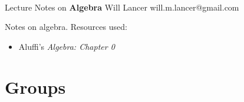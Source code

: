 \documentclass[11pt]{article}
\begin{document}
\thispagestyle{empty}
\bigskip \
\vspace{0.1cm}

\begin{center}
{\fontsize{22}{22} \selectfont Lecture Notes on}
\vskip 16pt
{\fontsize{36}{36} \selectfont \bf \sffamily Algebra}
\vskip 24pt
{\fontsize{18}{18} \selectfont \rmfamily Will Lancer} 
\vskip 6pt
{\fontsize{14}{14} \selectfont \ttfamily will.m.lancer@gmail.com} 
\vskip 24pt
\end{center}

{\parindent0pt \baselineskip=15.5pt}
\noin
Notes on algebra. Resources used:
\begin{itemize}
    \item Aluffi's \emph{Algebra: Chapter 0}
\end{itemize}

\newpage
\microtoc
\newpage

\section{Groups}
\end{document}
